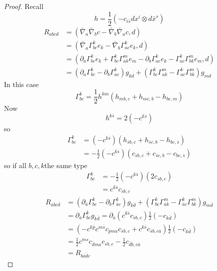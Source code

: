 \documentclass[12pt,letterpaper]{amsart}%
\numberwithin{mycounter}{section}
\theoremstyle{plain}
\numberwithin{equation}{section}
\theoremstyle{definition}
\begin{document}
\begin{proof}
Recall
\[
h=\frac{1}{2}(-c_{i\bar{s}}dx^{i}\otimes d\bar{x}^{s})
\]%
\begin{align*}
R_{abcd}  &  =\left(  \bar{\nabla}_{a}\bar{\nabla}_{b}c-\bar{\nabla}_{b}%
\bar{\nabla}_{a}c,d\right) \\
&  =\left(  \bar{\nabla}_{a}\Gamma_{bc}^{k}e_{k}-\bar{\nabla}_{b}\Gamma
_{ac}^{k}e_{k},d\right) \\
&  =\left(  \partial_{a}\Gamma_{bc}^{k}e_{k}+\Gamma_{bc}^{k}\Gamma_{ak}%
^{m}e_{m}-\partial_{b}\Gamma_{ac}^{k}e_{k}-\Gamma_{ac}^{k}\Gamma_{bk}^{m}%
e_{m},d\right) \\
&  =\left(  \partial_{a}\Gamma_{bc}^{k}-\partial_{b}\Gamma_{ac}^{k}\right)
g_{kd}+\left(  \Gamma_{bc}^{k}\Gamma_{ak}^{m}-\Gamma_{ac}^{k}\Gamma_{bk}%
^{m}\right)  g_{md}%
\end{align*}
In this case%
\[
\Gamma_{bc}^{k}=\frac{1}{2}h^{km}\left(  h_{mb,c}+h_{mc,b}-h_{bc,m}\right)
\]
Now
\[
h^{k\bar{s}}=2\left(  -c^{k\bar{s}}\right)
\]
so
\begin{align*}
\Gamma_{bc}^{k}  &  =\left(  -c^{k\bar{s}}\right)  \left(  h_{\bar{s}%
b,c}+h_{\bar{s}c,b}-h_{bc,\bar{s}}\right) \\
&  =-\frac{1}{2}\left(  -c^{k\bar{s}}\right)  \left(  c_{\bar{s}b,c}%
+c_{\bar{s}c,b}-c_{bc,\bar{s}}\right)
\end{align*}
so if all $b,c,k$the same type%
\begin{align*}
\Gamma_{bc}^{k}  &  =-\frac{1}{2}\left(  -c^{k\bar{s}}\right)  \left(
2c_{\bar{s}b,c}\right) \\
&  =c^{k\bar{s}}c_{\bar{s}b,c}%
\end{align*}%
\begin{align*}
R_{\bar{a}bc\bar{d}}  &  =\left(  \partial_{\bar{a}}\Gamma_{bc}^{k}%
-\partial_{b}\Gamma_{\bar{a}c}^{k}\right)  g_{k\bar{d}}+\left(  \Gamma
_{bc}^{k}\Gamma_{\bar{a}k}^{m}-\Gamma_{\bar{a}c}^{k}\Gamma_{bk}^{m}\right)
g_{m\bar{d}}\\
&  =\partial_{\bar{a}}\Gamma_{bc}^{k}g_{k\bar{d}}=\partial_{\bar{a}}\left(
c^{k\bar{s}}c_{\bar{s}b,c}\right)  \frac{1}{2}\left(  -c_{k\bar{d}}\right) \\
&  =\left(  -c^{k\bar{p}}c^{m\bar{s}}c_{\bar{p}ma}c_{\bar{s}b,c}+c^{k\bar{s}%
}c_{\bar{s}b,c\bar{a}}\right)  \frac{1}{2}\left(  -c_{k\bar{d}}\right) \\
&  =\frac{1}{2}c^{ms}c_{\bar{d}ma}c_{\bar{s}b,c}-\frac{1}{2}c_{\bar{d}%
b,c\bar{a}}\\
&  =R_{b\bar{a}\bar{d}c}%
\end{align*}

\end{proof}
\end{document}
